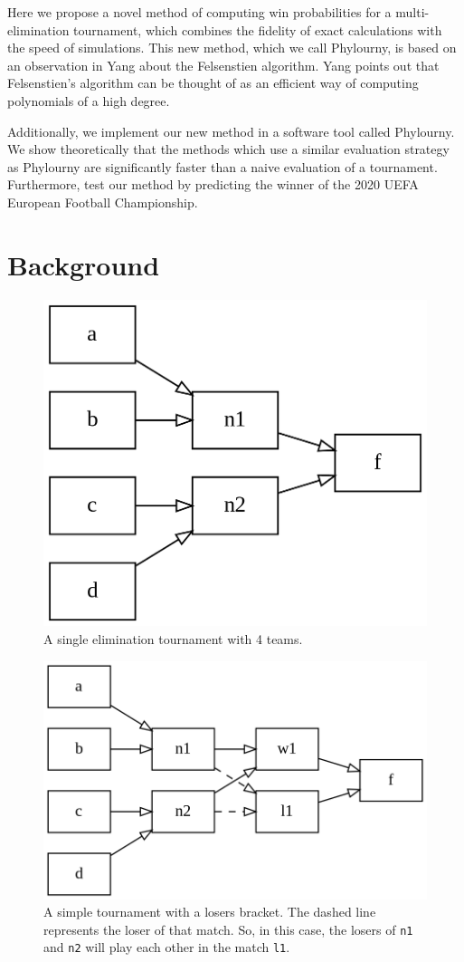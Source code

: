 \documentclass{article}
\begin{document}
Here we propose a novel method of computing win probabilities for a multi-elimination tournament, which combines the
fidelity of exact calculations with the speed of simulations. This new method, which we call Phylourny, is based on an
observation in Yang \cite{yang2006computational} about the Felsenstien algorithm. Yang points out that Felsenstien's
algorithm can be thought of as an efficient way of computing polynomials of a high degree. 


Additionally, we implement our new method in a software tool called Phylourny. We show theoretically that the methods
which use a similar evaluation strategy as Phylourny are significantly faster than a naive evaluation of a tournament.
Furthermore, test our method by predicting the winner of the 2020 UEFA European Football Championship\footnotemark.


\section{Background}

\begin{figure}[ht]
  \centering
  \includegraphics[width=.55\textwidth]{single-elim.png}
  \caption{A single elimination tournament with 4 teams.}
  \label{fig:single-elim}
\end{figure}

\begin{figure}[ht]
  \centering
  \includegraphics[width=.75\textwidth]{double-elim.png}
  \caption{A simple tournament with a losers bracket. The dashed line represents the loser of that match. So, in this
  case, the losers of \texttt{n1} and \texttt{n2} will play each other in the match \texttt{l1}.}
  \label{fig:double-elim}
\end{figure}
\end{document}
